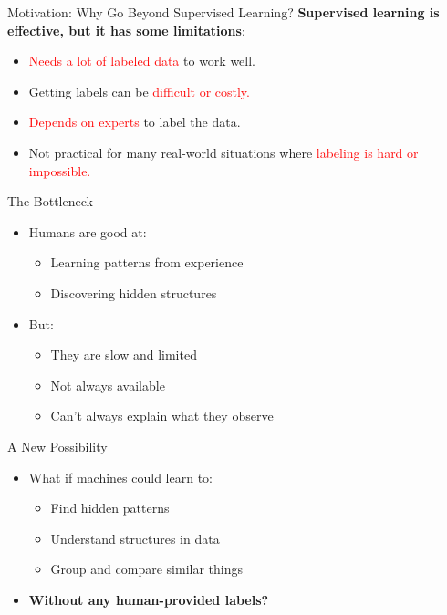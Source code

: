 \begin{frame}{Motivation: Why Go Beyond Supervised Learning?}
    \textbf{Supervised learning is effective, but it has some limitations}:
    \begin{itemize}
        \item \textcolor{red}{Needs a lot of labeled data} to work well.
        \item Getting labels can be \textcolor{red}{difficult or costly.}
        \item \textcolor{red}{Depends on experts} to label the data.
        \item Not practical for many real-world situations where \textcolor{red}{labeling is hard or impossible.}
    \end{itemize}
\end{frame}
\begin{frame}{The Bottleneck}
    \begin{itemize}
        \item Humans are good at:
        \begin{itemize}
            \item Learning patterns from experience
            \item Discovering hidden structures
        \end{itemize}
        \item But:
        \begin{itemize}
            \item They are slow and limited
            \item Not always available
            \item Can't always explain what they observe
        \end{itemize}
    \end{itemize}
\end{frame}

\begin{frame}{A New Possibility}
    \begin{itemize}
        \setlength{\itemsep}{1cm}
        \item What if machines could learn to:
        \begin{itemize}
            \item Find hidden patterns
            \item Understand structures in data
            \item Group and compare similar things
        \end{itemize}
        \item[] {\Large \textbf{Without any human-provided labels?}}
    \end{itemize}
\end{frame}

